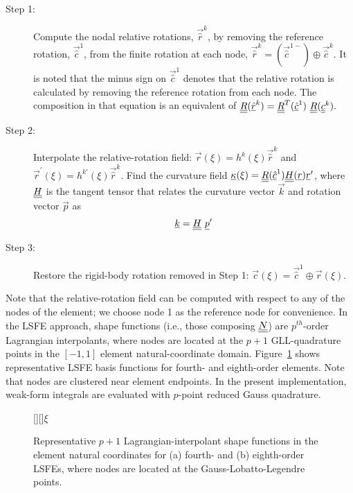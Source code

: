 \begin{description}

    \item[Step 1:] Compute the nodal relative rotations, $\vec{\hat{r}}^k$,
by removing the reference rotation, $\vec{\hat{c}}^1$, from the finite
rotation at each node, $\vec{\hat{r}}^k = (\vec{\hat{c}}^{1-}) \oplus
\vec{\hat{c}}^k$. It is noted that the minus sign on $\vec{\hat{c}}^1$ denotes that the relative rotation is calculated by removing the reference rotation from each node.  The composition in that equation is an equivalent of $\underline{\underline{R}}(\underline{\hat{r}}^k) = \underline{\underline{R}}^T(\underline{\hat{c}}^1)~\underline{\underline{R}}(\underline{\underline{c}}^k).$

    \item[Step 2:] Interpolate the relative-rotation field: $\vec{r}(\xi) = h^k(\xi) \vec{\hat{r}}^k$ and $\vec{r}^\prime(\xi) = h^{k \prime}(\xi) \vec{\hat{r}}^k$. Find the curvature field $\underline{\kappa}(\xi) = \underline{\underline{R}}(\underline{\hat{c}}^1) \underline{\underline{H}}(\underline{r}) \underline{r}^\prime$, where $\underline{\underline{H}}$ is the tangent tensor that relates the curvature vector $\vec{k}$ and rotation vector $\vec{p}$ as
\begin{equation}
    \label{Tensor}
    \underline{k} = \underline{\underline{H}}~ \underline{p}^\prime
\end{equation}

    \item[Step 3:] Restore the rigid-body rotation removed in Step 1: $\vec{c}(\xi) = \vec{\hat{c}}^1 \oplus \vec{r}(\xi)$.
\end{description} 


Note that the relative-rotation field can be computed with respect to any of
the nodes of the element; we choose node 1 as the reference node for
convenience. In the LSFE approach, shape functions (i.e., those composing $\underline{\underline{N}}$) are
$p^{th}$-order Lagrangian interpolants, where nodes are located at the $p+1$
GLL-quadrature points in the $[-1,1]$ element natural-coordinate domain.
Figure~\ref{fig:N4_lsfe} shows representative LSFE basis functions for  
fourth- and eighth-order elements.  Note that nodes are clustered near
element endpoints.
In the present implementation, weak-form integrals are evaluated with
$p$-point reduced Gauss quadrature.

\begin{figure}[h]
    \centering
    [][]{$\xi$}
    \caption{Representative $p+1$ Lagrangian-interpolant shape functions in
the element natural coordinates for
(a) fourth- and (b) eighth-order LSFEs, where nodes are located at the
Gauss-Lobatto-Legendre points.}
    \label{fig:N4_lsfe}
\end{figure}

